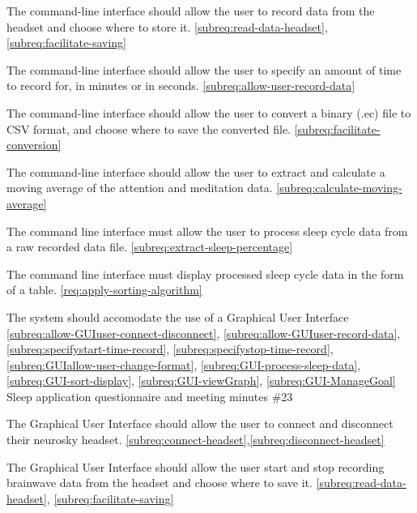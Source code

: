 {The command-line interface should allow the user to record data from the headset and choose where
  to store it.}
{\phigh}
{\ref{subreq:read-data-headset}, \ref{subreq:facilitate-saving}}
{}

{The command-line interface should allow the user to specify an amount of time to record for, in
  minutes or in seconds.}
{\phigh}
{\ref{subreq:allow-user-record-data}}
{}

{The command-line interface should allow the user to convert a binary (.ec) file to CSV format,
  and choose where to save the converted file.}
{\phigh}
{\ref{subreq:facilitate-conversion}}
{}

{The command-line interface should allow the user to extract and calculate a moving average of the
  attention and meditation data.}
{\phigh}
{\ref{subreq:calculate-moving-average}}
{}

{The command line interface must allow the user to process sleep cycle data from a raw recorded
  data file.}
{\phigh}
{\ref{subreq:extract-sleep-percentage}}
{}

{The command line interface must display processed sleep cycle data in the form of a table.}
{\phigh}
{\ref{req:apply-sorting-algorithm}}
{}

{The system should accomodate the use of a Graphical User Interface}
{\phigh}
{\ref{subreq:allow-GUIuser-connect-disconnect}, \ref{subreq:allow-GUIuser-record-data},
  \ref{subreq:specifystart-time-record}, \ref{subreq:specifystop-time-record},
  \ref{subreq:GUIallow-user-change-format}, \ref{subreq:GUI-process-sleep-data},
  \ref{subreq:GUI-sort-display}, \ref{subreq:GUI-viewGraph}, \ref{subreq:GUI-ManageGoal}}
{Sleep application questionnaire and meeting minutes \#23}

{The Graphical User Interface should allow the user to connect and disconnect their neurosky headset.}
{\phigh}
{\ref{subreq:connect-headset},\ref{subreq:disconnect-headset}}
{}

{The Graphical User Interface should allow the user start and stop recording brainwave data
  from the headset and choose where to save it.}
{\phigh}
{\ref{subreq:read-data-headset}, \ref{subreq:facilitate-saving}}
{}

